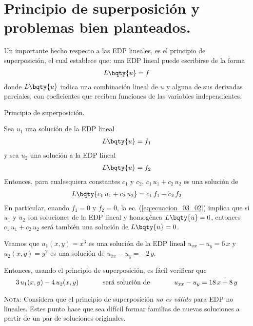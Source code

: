 \section{Principio de superposición y problemas bien planteados.}
Un importante hecho respecto a las EDP lineales, es el principio de superposición, el cual establece que: una EDP lineal puede escribirse de la forma
\begin{align}
L \bqty{u} = f
\label{eq:ecuacion_03_01}
\end{align}
donde $L \bqty{u}$ indica una combinación lineal de $u$ y alguna de sus derivadas parciales, con coeficientes que reciben funciones de las variables independientes.
\begin{defi}{Principio de superposición.}

Sea $u_{1}$ una solución de la EDP lineal
\begin{align*}
L \bqty{u} = f_{1}
\end{align*}
y sea $u_{2}$ una solución a la EDP lineal
\begin{align*}
L \bqty{u} = f_{2}
\end{align*}
Entonces, para cualesquiera constantes $c_{1}$ y $c_{2}$, $c_{1} \, u_{1} + c_{2} \, u_{2}$ es una solución de
\begin{align}
L \bqty{c_{1} \, u_{1} + c_{2} \, u_{2}} = c_{1} \, f_{1} + c_{2} \, f_{2}
\label{eq:ecuacion_03_02}
\end{align}
En particular, cuando $f_{1} = 0$ y $f_{2} = 0$, la ec. (\ref{eq:ecuacion_03_02}) implica que si $u_{1}$ y $u_{2}$ son soluciones de la EDP lineal y homogénea $L \bqty{u} = 0$, entonces $c_{1} \, u_{1} + c_{2} \, u_{2}$ será también una solución de $L \bqty{u} = 0$.
\end{defi}
\begin{ejemplo}
Veamos que $u_{1}(x, y) = x^{3}$ es una solución de la EDP lineal $u_{xx} - u_{y} = 6 \, x$ y $u_{2}(x, y) = y^{2}$ es una solución de $u_{xx} - u_{y} = - 2 \, y$.
\par
Entonces, usando el principio de superposición, es fácil verificar que
\begin{align*}
3 \, u_{1} (x, y) - 4 \, u_{2} (x, y) \hspace{1.25cm} \mbox{será solución de} \hspace{1.25cm} u_{xx} - u_{y} = 18 \, x + 8 \, y
\end{align*}
\end{ejemplo}
\textsc{Nota: } Considera que el principio de superposición \emph{no es válido} para EDP no lineales. Estes punto hace que sea difícil formar familias de nuevas soluciones a partir de un par de soluciones originales.
